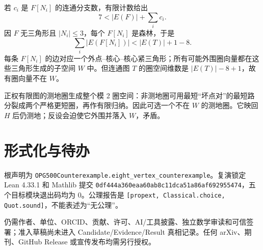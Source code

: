 \documentclass[11pt]{article}
\begin{document}
若 $c_i$ 是 $F[N_i]$ 的连通分支数，有限计数给出
\[
7<|E(F)|+\sum_i c_i.
\]
因 $F$ 无三角形且 $|N_i|\le3$，每个 $F[N_i]$ 是森林，于是
\[
\sum_i|E(F[N_i])|<|E(T)|+1-8.
\]
每条 $F[N_i]$ 的边对应一个外点--核心--核心紧三角形；所有可能外围圈向量都在这些三角形生成的子空间 $W$ 中。但连通图 $T$ 的圈空间维数是 $|E(T)|-8+1$，故有圈向量不在 $W$。

正权有限图的测地圈生成整个模 2 圈空间：非测地圈可用最短“坏点对”的最短路分裂成两个严格更短圈，再作有限归纳。因此可选一个不在 $W$ 的测地圈。它映回 $H$ 后仍测地；反设会迫使它外围并落入 $W$，矛盾。

\section{形式化与待办}
根声明为 \texttt{OPG500Counterexample.eight\_vertex\_counterexample}。复演锁定 Lean 4.33.1 和 Mathlib 提交 \texttt{0df444a360eaa60ab8c11dca51a86af692955474}，五个目标模块退出码均为 0。公理报告是 \texttt{[propext, Classical.choice, Quot.sound]}，不能表述为“无公理”。

仍需作者、单位、ORCID、贡献、许可、AI/工具披露、独立数学审读和可信签署；准入草稿尚未进入 Candidate/Evidence/Result 真相记录。任何 arXiv、期刊、GitHub Release 或宣传发布均需另行授权。
\end{document}
